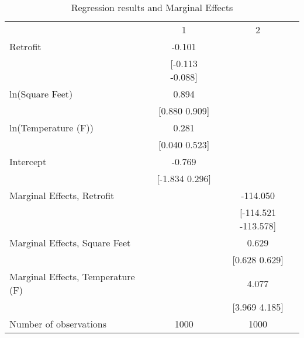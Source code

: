 \documentclass{article}
\begin{document}
\begin{table}[!h]
\caption{Regression results and Marginal Effects}
\centering
\begin{tabular}{lll}
\cline{1-3}
\multicolumn{1}{r}{} &
  \multicolumn{1}{c}{1} &
  \multicolumn{1}{c}{2} \\
\cline{1-3}
\multicolumn{1}{l}{Retrofit} &
  \multicolumn{1}{c}{-0.101} &
  \multicolumn{1}{c}{} \\
\multicolumn{1}{l}{} &
  \multicolumn{1}{c}{[-0.113    -0.088]} &
  \multicolumn{1}{c}{} \\
\multicolumn{1}{l}{ln(Square Feet)} &
  \multicolumn{1}{c}{0.894} &
  \multicolumn{1}{c}{} \\
\multicolumn{1}{l}{} &
  \multicolumn{1}{c}{[0.880     0.909]} &
  \multicolumn{1}{c}{} \\
\multicolumn{1}{l}{ln(Temperature (F))} &
  \multicolumn{1}{c}{0.281} &
  \multicolumn{1}{c}{} \\
\multicolumn{1}{l}{} &
  \multicolumn{1}{c}{[0.040     0.523]} &
  \multicolumn{1}{c}{} \\
\multicolumn{1}{l}{Intercept} &
  \multicolumn{1}{c}{-0.769} &
  \multicolumn{1}{c}{} \\
\multicolumn{1}{l}{} &
  \multicolumn{1}{c}{[-1.834     0.296]} &
  \multicolumn{1}{c}{} \\
\multicolumn{1}{l}{Marginal Effects, Retrofit} &
  \multicolumn{1}{c}{} &
  \multicolumn{1}{c}{-114.050} \\
\multicolumn{1}{l}{} &
  \multicolumn{1}{c}{} &
  \multicolumn{1}{c}{[-114.521  -113.578]} \\
\multicolumn{1}{l}{Marginal Effects, Square Feet} &
  \multicolumn{1}{c}{} &
  \multicolumn{1}{c}{0.629} \\
\multicolumn{1}{l}{} &
  \multicolumn{1}{c}{} &
  \multicolumn{1}{c}{[0.628     0.629]} \\
\multicolumn{1}{l}{Marginal Effects, Temperature (F)} &
  \multicolumn{1}{c}{} &
  \multicolumn{1}{c}{4.077} \\
\multicolumn{1}{l}{} &
  \multicolumn{1}{c}{} &
  \multicolumn{1}{c}{[3.969     4.185]} \\
\multicolumn{1}{l}{Number of observations} &
  \multicolumn{1}{c}{1000} &
  \multicolumn{1}{c}{1000} \\
\cline{1-3}
\end{tabular}
\end{table}
\end{document}
